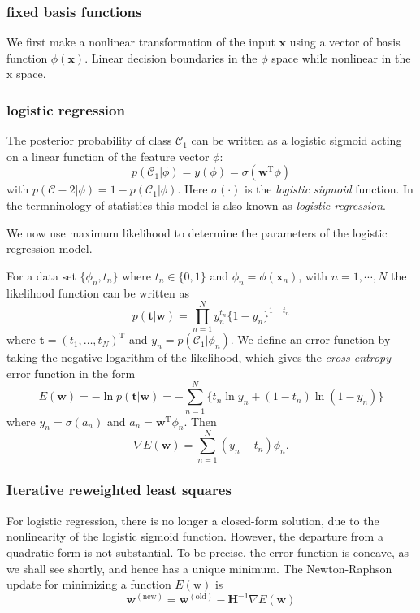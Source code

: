 \documentclass[a4paper]{book}
\newcommand{\mrm}{\mathrm}
\newcommand{\mbf}{\mathbf}
\newcommand{\mcal}{\mathcal}
\newcommand{\ww}{\mbf w}
\newcommand{\ttt}{\mbf t}
\newcommand{\xx}{\mbf x}
\newcommand{\cat}{\mcal C}
\newcommand{\trans}{^{\mrm T}}
\begin{document}
\subsubsection{fixed basis functions}
We first make a nonlinear transformation of the input $\xx$ using a vector of basis function $\phi(\xx)$. Linear decision boundaries in the $\phi$ space while nonlinear in the $\mathrm x$ space.
\subsubsection{logistic regression}
The posterior probability of class $\cat_1$ can be written as a logistic sigmoid acting on a linear function of the feature vector $\phi$:
\begin{equation}\label{}
  p(\cat_1|\phi)=y(\phi)=\sigma(\ww\trans\phi)
\end{equation}
with $p(\cat-2|\phi) = 1-p(\cat_1|\phi)$. Here $\sigma(\cdot)$ is the \textit{logistic sigmoid} function. In the termninology of statistics this model is also known as \textit{logistic regression}.

We now use maximum likelihood to determine the parameters of the logistic regression model.

For a data set $\{\phi_n,t_n\}$ where $t_n\in\{0,1\}$ and $\phi_n=\phi(\xx_n)$, with $n=1,\cdots,N$ the likelihood function can be written as
\begin{equation}\label{}
  p(\ttt|\ww) = \prod_{n=1}^{N}y_n^{t_n}\{1-y_n\}^{1-t_n}
\end{equation}
where $\ttt = (t_1,\dots,t_N)\trans$ and $y_n = p(\cat_1|\phi_n)$. We define an error function by taking the negative logarithm of the likelihood, which gives the \textit{cross-entropy} error function in the form
\begin{equation}\label{}
  E(\ww) = -\ln p(\ttt|\ww) = -\sum_{n=1}^{N}\{t_n\ln y_n+(1-t_n)\ln(1-y_n)\}
\end{equation}
where $y_n=\sigma(a_n)$ and $a_n=\ww\trans\phi_n$. Then
\begin{equation}\label{}
  \nabla E(\ww) = \sum_{n=1}^{N}(y_n-t_n)\phi_n.
\end{equation}


\subsubsection{Iterative reweighted least squares }
For logistic regression, there is no longer a closed-form solution, due to the nonlinearity of the logistic sigmoid function. However, the departure from a quadratic form is not substantial. To be precise, the error function is concave, as we shall see shortly, and hence has a unique minimum.\newline
The Newton-Raphson update for minimizing a function $E(\mathrm w)$ is
\begin{equation}
   \ww^{(\mathrm {new})}=\ww^{(\mathrm {old})}-\mbf H^{-1}\nabla E(\ww)
\end{equation}
\end{document}
